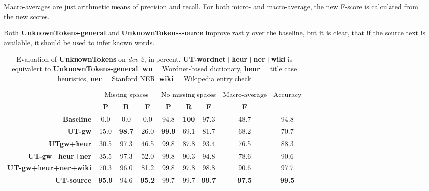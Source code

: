 \documentclass[a4paper,10pt]{scrartcl}
\theoremstyle{style}
\begin{document}
Macro-averages are just arithmetic means of precision and recall. For both micro- and macro-average, the new F-score is calculated from the new scores.

Both \textbf{UnknownTokens-general} and \textbf{UnknownTokens-source} improve vastly over the baseline, but it is clear, that if the source text is available, it should be used to infer known words.

\begin{table}
\begin{center}
\begin{tabular}{|r|c|c|c|c|c|c|c|c|}
\hline
& \multicolumn{3}{c|}{Missing spaces} & \multicolumn{3}{c|}{No missing spaces} & Macro-average & Accuracy\\
& \textbf{P} & \textbf{R} & \textbf{F} & \textbf{P} & \textbf{R} & \textbf{F} & \textbf{F} & \\
\hline
\textbf{Baseline} & 0.0 & 0.0 & 0.0 & 94.8 & \textbf{100} & 97.3 & 48.7 & 94.8\\
\hline
\textbf{UT-gw} & 15.0 & \textbf{98.7} & 26.0 & \textbf{99.9} & 69.1 & 81.7 & 68.2 & 70.7\\
\hline
\textbf{UTgw+heur} & 30.5 & 97.3 & 46.5 & 99.8 & 87.8 & 93.4 & 76.5 & 88.3\\
\hline
\textbf{UT-gw+heur+ner} & 35.5 & 97.3 & 52.0 & 99.8 & 90.3 & 94.8 & 78.6 & 90.6\\
\hline
\textbf{UT-gw+heur+ner+wiki} & 70.3 & 96.0 & 81.2 & 99.8 & 97.8 & 98.8 & 90.6 & 97.7\\
\hline
\textbf{UT-source} & \textbf{95.9} & 94.6 & \textbf{95.2} & 99.7 & 99.7 & \textbf{99.7} & \textbf{97.5} & \textbf{99.5}\\
\hline
\end{tabular}
\end{center}
\caption{Evaluation of \textbf{UnknownTokens} on \textit{dev-2}, in percent. \textbf{UT-wordnet+heur+ner+wiki} is equivalent to \textbf{UnknownTokens-general}. \textbf{wn} = Wordnet-based dictionary, \textbf{heur} = title case heuristics, \textbf{ner} = Stanford NER, \textbf{wiki} = Wikipedia entry check}
\label{eval_unknowntokens}
\end{table}
\end{document}
